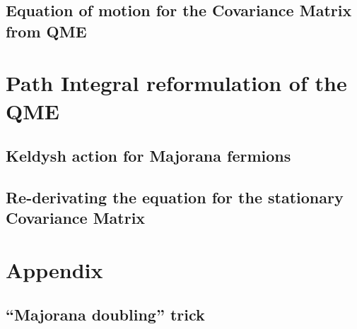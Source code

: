 \documentclass[a4paper,11pt]{article}
\begin{document}
  
  \subsection{Equation of motion for the Covariance Matrix from QME}
 \section{Path Integral reformulation of the QME}
  \subsection{Keldysh action for Majorana fermions}
  \subsection{Re-derivating the equation for the stationary Covariance Matrix}

  \appendix
  \section*{Appendix}
    \renewcommand{\thesection}{A}
    \subsection{``Majorana doubling'' trick}
   
   
{}
  
\end{document}
